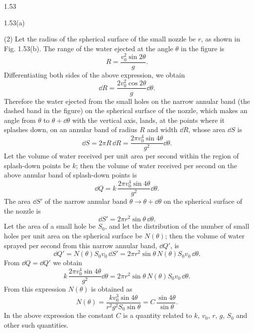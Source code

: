 \begin{solution}{1.53}
\begin{figbox}{1.53(a)}
\end{figbox}

(2) Let the radius of the spherical surface of the small nozzle be $r$, as shown in Fig. 1.53(b). The range of the water ejected at the angle $\theta$ in the figure is
\[
R=\frac{v_0^2\sin2\theta}{g}.
\]
Differentiating both sides of the above expression, we obtain
\[
\dd R=\frac{2v_0^2\cos2\theta}{g}\dd\theta.
\]
Therefore the water ejected from the small holes on the narrow annular band (the dashed band in the figure) on the spherical surface of the nozzle, which makes an angle from $\theta$ to $\theta+\dd\theta$ with the vertical axis, lands, at the points where it splashes down, on an annular band of radius $R$ and width $\dd R$, whose area $\dd S$ is
\[
\dd S=2\pi R\,\dd R=\frac{2\pi v_0^4\sin4\theta}{g^2}\dd\theta.
\]
Let the volume of water received per unit area per second within the region of splash-down points be $k$; then the volume of water received per second on the above annular band of splash-down points is
\[
\dd Q=k\,\frac{2\pi v_0^4\sin4\theta}{g^2}\dd\theta.
\]
The area $\dd S'$ of the narrow annular band $\theta\to\theta+\dd\theta$ on the spherical surface of the nozzle is
\[
\dd S'=2\pi r^2\sin\theta\,\dd\theta.
\]
Let the area of a small hole be $S_0$, and let the distribution of the number of small holes per unit area on the spherical surface be $N(\theta)$; then the volume of water sprayed per second from this narrow annular band, $\dd Q'$, is
\[
\dd Q'=N(\theta)S_0v_0\,\dd S'=2\pi r^2\sin\theta\,N(\theta)S_0v_0\,\dd\theta.
\]
From $\dd Q=\dd Q'$ we obtain
\[
k\,\frac{2\pi v_0^4\sin4\theta}{g^2}\dd\theta=2\pi r^2\sin\theta\,N(\theta)S_0v_0\,\dd\theta.
\]
From this expression $N(\theta)$ is obtained as
\[
N(\theta)=\frac{kv_0^3\sin4\theta}{r^2g^2S_0\sin\theta}=C\,\frac{\sin4\theta}{\sin\theta}.
\]
In the above expression the constant $C$ is a quantity related to $k$, $v_0$, $r$, $g$, $S_0$ and other such quantities.


\end{solution}
